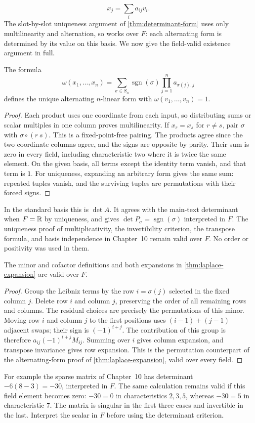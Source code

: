\[
x_j=\sum_i a_{ij}v_i.
\]
 The slot-by-slot uniqueness argument of
\cref{thm:determinant-form} uses only multilinearity and alternation,
so works over $F$: each alternating form is determined by its value on
this basis. We now give the field-valid existence argument in full.
\begin{theorem}
The formula
\[
\omega(x_1,\ldots,x_n)=\sum_{\sigma\in S_n}
\operatorname{sgn}(\sigma)\prod_{j=1}^n a_{\sigma(j),j}
\]
defines the unique alternating $n$-linear form with
$\omega(v_1,\ldots,v_n)=1$.
\end{theorem}
\begin{proof}
Each product uses one coordinate from each input, so
distributing sums or scalar multiples in one column proves multilinearity.
If $x_r=x_s$ for $r\ne s$, pair $\sigma$ with $\sigma\circ(r\ s)$.
This is a fixed-point-free pairing. The products agree since the two
coordinate columns agree, and the signs are opposite by parity. Their
sum is zero in every field, including characteristic two where it is
twice the same element. On the given basis, all terms except the identity
term vanish, and that term is $1$. For uniqueness, expanding an arbitrary
form gives the same sum: repeated tuples vanish, and the surviving tuples
are permutations with their forced signs.
\end{proof}
In the standard basis this is $\det A$. It agrees with the main-text
determinant when $F=\mathbb{R}$ by uniqueness, and gives
$\det P_\sigma=\operatorname{sgn}(\sigma)$ interpreted in $F$.
The uniqueness proof of multiplicativity, the invertibility criterion,
the transpose formula, and basis independence in Chapter~10 remain valid
over $F$. No order or positivity was used in them.

\begin{proposition}
The minor and cofactor definitions and both expansions in
\cref{thm:laplace-expansion} are valid over $F$.
\end{proposition}
\begin{proof}
Group the Leibniz terms by the row $i=\sigma(j)$ selected in the fixed
column $j$. Delete row $i$ and column $j$, preserving the order of all
remaining rows and columns. The residual choices are precisely the
permutations of this minor. Moving row $i$ and column $j$ to the first
positions uses $(i-1)+(j-1)$ adjacent swaps; their sign is $(-1)^{i+j}$.
The contribution of this group is therefore $a_{ij}(-1)^{i+j}M_{ij}$.
Summing over $i$ gives column expansion, and transpose invariance gives
row expansion. This is the permutation counterpart of the alternating-form
proof of \cref{thm:laplace-expansion}, valid over every field.
\end{proof}
For example the sparse matrix of Chapter~10 has determinant
$-6(8-3)=-30$, interpreted in $F$. The same calculation remains valid
if this field element becomes zero: $-30=0$ in characteristics $2,3,5$,
whereas $-30=5$ in characteristic $7$. The matrix is singular in the
first three cases and invertible in the last. Interpret the scalar in
$F$ before using the determinant criterion.

